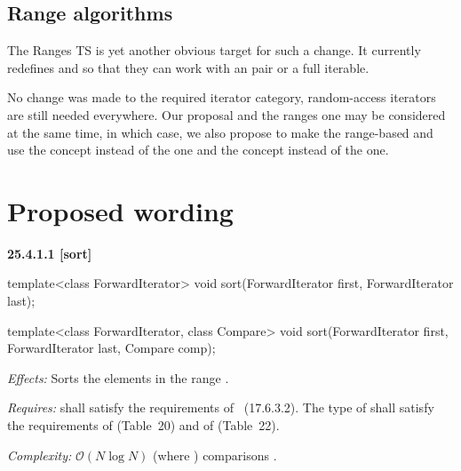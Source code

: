 \documentclass{isocpp_proposal}
\begin{document}
\subsection{Range algorithms}

The Ranges TS \cite{N4560} is yet another obvious target for such a change. It currently redefines  and  so that they can work with an \tcode{[iterator, sentinel)} pair or a full iterable.

\vspace{0.3cm}

No change was made to the required iterator category, random-access iterators are still needed everywhere. Our proposal and the ranges one may be considered at the same time, in which case, we also propose to make the range-based  and  use the  concept instead of the  one and the  concept instead of the  one.

\section{Proposed wording}

\textbf{25.4.1.1  [sort]}

\begin{itemdecl}
template<class ForwardIterator>
  void sort(ForwardIterator first, ForwardIterator last);

template<class ForwardIterator, class Compare>
  void sort(ForwardIterator first, ForwardIterator last,
            Compare comp);
\end{itemdecl}

\begin{itemdescr}
\pnum
\emph{Effects:} Sorts the elements in the range \tcode{[first, last)}.

\pnum
\emph{Requires:}  shall satisfy the requirements of
~(17.6.3.2). The type of  shall satisfy the requirements of  (Table~20) and of  (Table~22).

\pnum
\emph{Complexity:} $\mathcal{O}(N \log{} N)$ (where ) comparisons .
\end{itemdescr}
\end{document}
